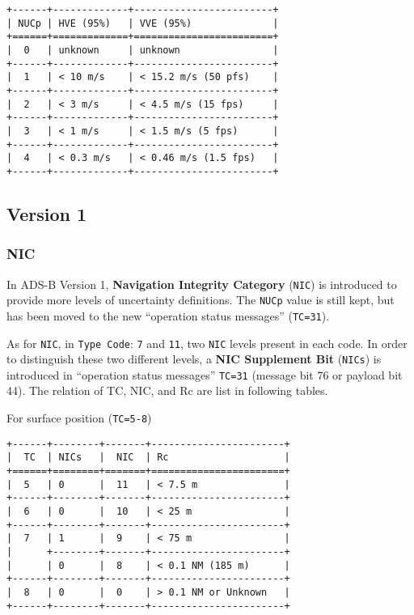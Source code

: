 \begin{verbatim}
+------+-------------+------------------------+
| NUCp | HVE (95%)   | VVE (95%)              |
+======+=============+========================+
|  0   | unknown     | unknown                |
+------+-------------+------------------------+
|  1   | < 10 m/s    | < 15.2 m/s (50 pfs)    |
+------+-------------+------------------------+
|  2   | < 3 m/s     | < 4.5 m/s (15 fps)     |
+------+-------------+------------------------+
|  3   | < 1 m/s     | < 1.5 m/s (5 fps)      |
+------+-------------+------------------------+
|  4   | < 0.3 m/s   | < 0.46 m/s (1.5 fps)   |
+------+-------------+------------------------+
\end{verbatim}

\subsection{Version 1}\label{version-1}

\subsubsection{NIC}\label{nic}

In ADS-B Version 1, \textbf{Navigation Integrity Category}
(\texttt{NIC}) is introduced to provide more levels of uncertainty
definitions. The \texttt{NUCp} value is still kept, but has been moved
to the new ``operation status messages'' (\texttt{TC=31}).

As for \texttt{NIC}, in \texttt{Type\ Code}: \texttt{7} and \texttt{11},
two \texttt{NIC} levels present in each code. In order to distinguish
these two different levels, a \textbf{NIC Supplement Bit}
(\texttt{NICs}) is introduced in ``operation status messages''
\texttt{TC=31} (message bit 76 or payload bit 44). The relation of TC,
NIC, and Rc are list in following tables.

For surface position (\texttt{TC=5-8})

\begin{verbatim}
+------+--------+-------+-----------------------+
|  TC  | NICs   |  NIC  | Rc                    |
+======+========+=======+=======================+
|  5   | 0      |  11   | < 7.5 m               |
+------+--------+-------+-----------------------+
|  6   | 0      |  10   | < 25 m                |
+------+--------+-------+-----------------------+
|  7   | 1      |  9    | < 75 m                |
|      +--------+-------+-----------------------+
|      | 0      |  8    | < 0.1 NM (185 m)      |
+------+--------+-------+-----------------------+
|  8   | 0      |  0    | > 0.1 NM or Unknown   |
+------+--------+-------+-----------------------+
\end{verbatim}

